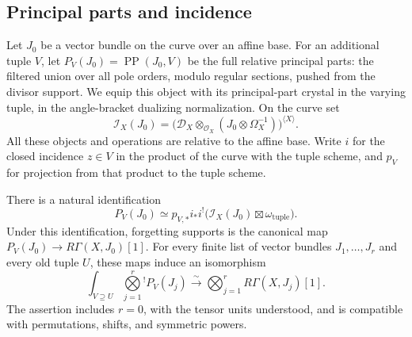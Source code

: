 \subsection{Principal parts and incidence}

Let $J_0$ be a vector bundle on the curve over an affine base.  For an
additional tuple $V$, let $P_V(J_0)=\operatorname{PP}(J_0,V)$ be the full
relative principal parts: the filtered union over all pole orders, modulo
regular sections, pushed from the divisor support.  We equip this object
with its principal-part crystal in the varying tuple, in the
angle-bracket dualizing normalization.  On the curve set
\[
 \mathcal I_X(J_0)=
 \bigl(\mathscr D_X\otimes_{\mathcal O_X}
               (J_0\otimes\Omega_X^{-1})\bigr)^{\langle X\rangle}.
\]
All these objects and operations are relative to the affine base.  Write
$i$ for the closed incidence $z\in V$ in the product of the curve with the
tuple scheme, and $p_V$ for projection from that product to the tuple
scheme.

\begin{lemma}\label{lem:ran-principal-parts}
There is a natural identification
\begin{equation}\label{eq:T17}
 P_V(J_0)\simeq
 p_{V,*}i_*i^!\bigl(\mathcal I_X(J_0)
                         \boxtimes\omega_{\mathrm{tuple}}\bigr).
\end{equation}
Under this identification, forgetting supports is the canonical map
$P_V(J_0)\to R\Gamma(X,J_0)[1]$.  For every finite list of vector bundles
$J_1,\ldots,J_r$ and every old tuple $U$, these maps induce an isomorphism
\begin{equation}\label{eq:T18}
 \int_{V\supseteq U}\mathop{\bigotimes}\limits_{j=1}^r{}^{!} P_V(J_j)
 \xrightarrow{\ \sim\ }
 \bigotimes_{j=1}^r R\Gamma(X,J_j)[1].
\end{equation}
The assertion includes $r=0$, with the tensor units understood, and is
compatible with permutations, shifts, and symmetric powers.
\end{lemma}

